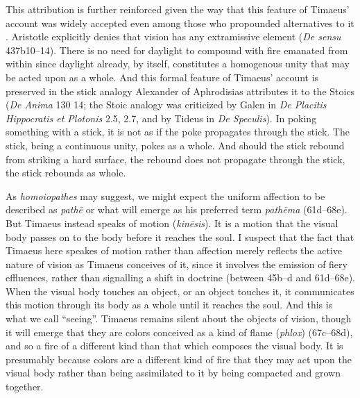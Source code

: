 This attribution is further reinforced given the way that this feature of Timaeus' account was widely accepted even among those who propounded alternatives to it \cite[chapter 1]{Lindberg:1977aa}. Aristotle explicitly denies that vision has any extramissive element (\emph{De sensu} 437b10--14). There is no need for daylight to compound with fire emanated from within since daylight already, by itself, constitutes a homogenous unity that may be acted upon as a whole. And this formal feature of Timaeus' account is preserved in the stick analogy Alexander of Aphrodisias attributes it to the Stoics (\emph{De Anima} 130 14; the Stoic analogy was criticized by Galen in \emph{De Placitis Hippocratis et Plotonis} 2.5, 2.7, and by Tideus in \emph{De Speculis}). In poking something with a stick, it is not as if the poke propagates through the stick. The stick, being a continuous unity, pokes as a whole. And should the stick rebound from striking a hard surface, the rebound does not propagate through the stick, the stick rebounds as whole.

As \emph{homoiopathes} may suggest, we might expect the uniform affection to be described as \emph{pathē} or what will emerge as his preferred term \emph{pathēma} (61d--68e). But Timaeus instead speaks of motion (\emph{kinēsis}). It is a motion that the visual body passes on to the body before it reaches the soul. I suspect that the fact that Timaeus here speakes of motion rather than affection merely reflects the active nature of vision as Timaeus conceives of it, since it involves the emission of fiery effluences, rather than signalling a shift in doctrine (between 45b--d and 61d--68e). When the visual body touches an object, or an object touches it, it communicates this motion through its body as a whole until it reaches the soul. And this is what we call ``seeing''. Timaeus remains silent about the objects of vision, though it will emerge that they are colors conceived as a kind of flame (\emph{phlox}) (67c–68d), and so a fire of a different kind than that which composes the visual body. It is presumably because colors are a different kind of fire that they may act upon the visual body rather than being assimilated to it by being compacted and grown together.


